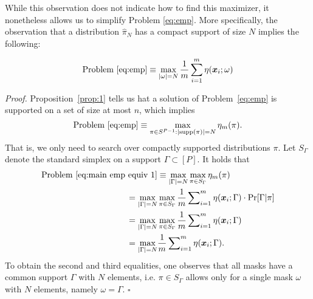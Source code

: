 While this observation does not indicate how to find this maximizer, it nonetheless allows us to simplify Problem \ref{eq:emp}. More specifically, the observation that a distribution $\widehat{\pi}_N$ has a compact support of size $N$ implies the following:
\begin{proposition}
\begin{equation}
\text{Problem \ref{eq:emp}} \equiv  \max_{|\omega|=N}  \frac{1}{m}\sum_{i=1}^m \eta({\bm{x}}_{i}; \omega) \label{eq:greedy}
\end{equation}\label{prop:2}


    {\normalfont \noindent \textit{Proof.} Proposition~\ref{prop:1} tells us hat a solution of Problem~\ref{eq:emp} is supported on a set of size at most $n$, which implies
    \begin{equation}
    \text{Problem \ref{eq:emp}} \equiv 
    \max_{\pi\in S^{P-1}: |\text{supp}(\pi)| = N }\eta_m(\pi)\label{eq:main emp equiv 1}.
    \end{equation} 
    That is, we only need to search over compactly supported distributions $\pi$. Let $S_\Gamma$ denote the standard simplex on a support $\Gamma\subset [P]$. It holds that
    \begin{align}
    \text{Problem \ref{eq:main emp equiv 1}} &  \equiv
    \max_{|\Gamma|=N} \max_{\pi\in S_\Gamma}\eta_m(\pi) \nonumber\\
    = \max_{|\Gamma|=N} &\max_{\pi \in S_\Gamma} \frac{1}{m}\sum\nolimits_{i=1}^m\eta({\bm{x}}_{i};\Gamma) \cdot \Pr[\Gamma|\pi] \nonumber\\
    = \max_{|\Gamma|=N}& \max_{\pi \in S_\Gamma} \frac{1}{m}\sum\nolimits_{i=1}^m\eta({\bm{x}}_{i};\Gamma) \nonumber\\
    =  \max_{|\Gamma|=N} & \frac{1}{m}\sum\nolimits_{i=1}^m\eta({\bm{x}}_{i};\Gamma).
    \label{eq:main emp equiv 2}
    \end{align}
    To obtain the second and third equalities, one observes that all masks have a common support $\Gamma$ with $N$ elements, i.e. $\pi\in S_\Gamma$ allows only for a single mask $\omega$ with  $N$ elements, namely $\omega=\Gamma$. \hfill $\square$}
    
\end{proposition}
